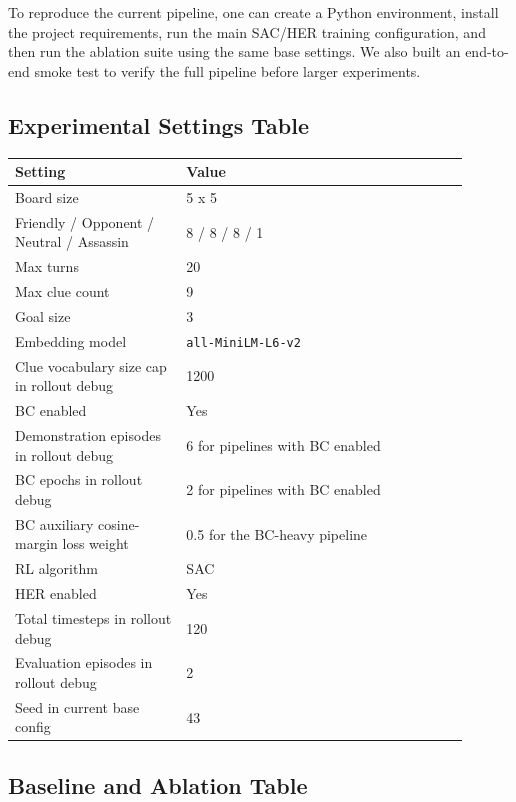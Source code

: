 \documentclass[9pt]{article}
\begin{document}
To reproduce the current pipeline, one can create a Python
environment, install the project requirements, run the main SAC/HER
training configuration, and then run the ablation suite using the same
base settings. We also built an end-to-end smoke test to verify the full
pipeline before larger experiments.

\subsection{Experimental Settings
Table}\label{experimental-settings-table}

\begin{longtable}[]{|p{0.34\linewidth}|p{0.56\linewidth}|}
\hline
\rowcolor{gray!20}
\textbf{Setting} & \textbf{Value} \\ \hline
\endhead
\hline
\endlastfoot
Board size & 5 x 5 \\ \hline
Friendly / Opponent / Neutral / Assassin & 8 / 8 / 8 / 1 \\ \hline
Max turns & 20 \\ \hline
Max clue count & 9 \\ \hline
Goal size & 3 \\ \hline
Embedding model & \texttt{all-MiniLM-L6-v2} \\ \hline
Clue vocabulary size cap in rollout debug & 1200 \\ \hline
BC enabled & Yes \\ \hline
Demonstration episodes in rollout debug & 6 for pipelines with BC enabled \\ \hline
BC epochs in rollout debug & 2 for pipelines with BC enabled \\ \hline
BC auxiliary cosine-margin loss weight & 0.5 for the BC-heavy pipeline \\ \hline
RL algorithm & SAC \\ \hline
HER enabled & Yes \\ \hline
Total timesteps in rollout debug & 120 \\ \hline
Evaluation episodes in rollout debug & 2 \\ \hline
Seed in current base config & 43 \\ \hline
\end{longtable}

\subsection{Baseline and Ablation
Table}\label{baseline-and-ablation-template}
\end{document}
